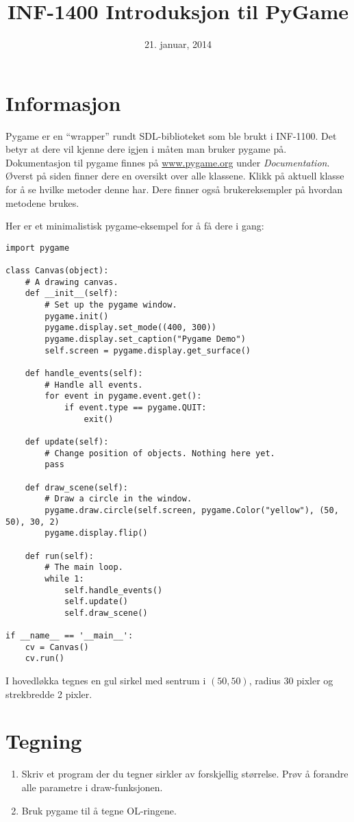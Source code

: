 \documentclass[12pt, norsk, a4paper]{article}
\title{INF-1400 Introduksjon til PyGame}
\date{21. januar, 2014}
\begin{document}
\maketitle

\section*{Informasjon}
Pygame er en ``wrapper'' rundt SDL-biblioteket som ble brukt i INF-1100. Det
betyr at dere vil kjenne dere igjen i måten man bruker pygame på. Dokumentasjon
til pygame finnes på \url{www.pygame.org} under \emph{Documentation}. Øverst på
siden finner dere en oversikt over alle klassene. Klikk på aktuell klasse for å
se hvilke metoder denne har. Dere finner også brukereksempler på hvordan
metodene brukes.

Her er et minimalistisk pygame-eksempel for å få dere i gang:
\begin{verbatim}
import pygame

class Canvas(object):
    # A drawing canvas.
    def __init__(self):
        # Set up the pygame window.
        pygame.init()
        pygame.display.set_mode((400, 300))
        pygame.display.set_caption("Pygame Demo")
        self.screen = pygame.display.get_surface()

    def handle_events(self):
        # Handle all events.
        for event in pygame.event.get():
            if event.type == pygame.QUIT:
                exit()

    def update(self):
        # Change position of objects. Nothing here yet.
        pass

    def draw_scene(self):
        # Draw a circle in the window.
        pygame.draw.circle(self.screen, pygame.Color("yellow"), (50, 50), 30, 2)
        pygame.display.flip()

    def run(self):
        # The main loop.
        while 1:
            self.handle_events()
            self.update()
            self.draw_scene()

if __name__ == '__main__':
    cv = Canvas()
    cv.run()
\end{verbatim}
I hovedløkka tegnes en gul sirkel med sentrum i $(50, 50)$, radius 30 pixler og
strekbredde 2 pixler.

\section{Tegning}
\begin{enumerate}
\item Skriv et program der du tegner sirkler av forskjellig størrelse. Prøv å
forandre alle parametre i draw-funksjonen.
\item Bruk pygame til å tegne OL-ringene.
\end{enumerate}
\end{document}
